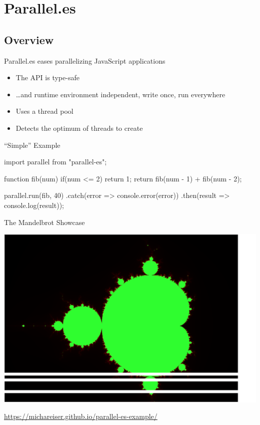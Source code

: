 \section{Parallel.es}
\subsection{Overview}

\begin{frame}{Parallel.es eases parallelizing JavaScript applications}
	\begin{itemize}
		\item The API is type-safe
		\item \dots and runtime environment independent, write once, run everywhere
		\item Uses a thread pool
		\item Detects the optimum of threads to create
	\end{itemize}
\end{frame}

\begin{frame}[fragile]{\enquote{Simple} Example}
	\begin{javascriptcode}
import parallel from "parallel-es";

function fib(num) {
	if(num <= 2) {
		return 1;
	}
	return fib(num - 1) + fib(num - 2);
}

parallel.run(fib, 40)
	.catch(error => console.error(error))
	.then(result => console.log(result));
	\end{javascriptcode}
\end{frame}

\begin{frame}{The Mandelbrot Showcase}
	\begin{center}
		\includegraphics[height=0.7\textheight]{mandelbrot}
	\end{center}
	
	\url{https://michareiser.github.io/parallel-es-example/}
\end{frame}

